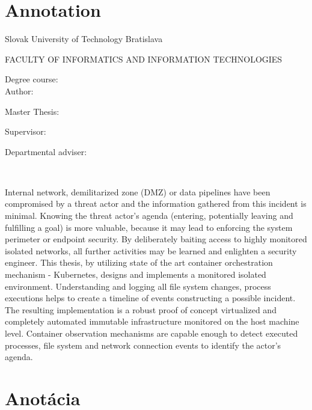 
\thispagestyle{empty}

\section*{Annotation}

\begin{minipage}[t]{1\columnwidth}%
Slovak University of Technology Bratislava 

FACULTY OF INFORMATICS AND INFORMATION TECHNOLOGIES

Degree course: \myStudyProgram\\

Author: \myName

Master Thesis: \myTitle

Supervisor: \mySupervisor

Departmental adviser: \myDepartSupervisor

\myDate\\
\end{minipage}


Internal network, demilitarized zone (DMZ) or data pipelines have been compromised by a threat actor and the information gathered from this incident is minimal. Knowing the threat actor's agenda (entering, potentially leaving and fulfilling a goal) is more valuable, because it may lead to enforcing the system perimeter or endpoint security. By deliberately baiting access to highly monitored isolated networks, all further activities may be learned and enlighten a security engineer. This thesis, by utilizing state of the art container orchestration mechanism - Kubernetes, designs and implements a monitored isolated environment. Understanding and logging all file system changes, process executions helps to create a timeline of events constructing a possible incident. The resulting implementation is a robust proof of concept virtualized and completely automated immutable infrastructure monitored on the host machine level. Container observation mechanisms are capable enough to detect executed processes, file system and network connection events to identify the actor's agenda.


\newpage{}\thispagestyle{empty}

\newpage
\thispagestyle{empty}
\mbox{}
\newpage

\thispagestyle{empty}
\section*{Anotácia}

